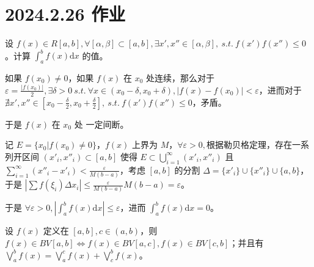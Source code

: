 \ifx\allfiles\undefined

\date{}
\author{尹锦润}

\maketitle
\fi

\section{2024.2.26 作业}

\begin{ques}
	设 $\displaystyle f( x) \in R[ a,b] ,\forall [ \alpha ,\beta ] \subset [ a,b] ,\exists x',x''\in [ \alpha ,\beta ] ,\ s.t.\ f( x') f( x'') \leqslant 0$。计算 $\displaystyle \int _{a}^{b} f( x)\mathrm{d} x$ 的值。
\end{ques}



如果 $\displaystyle f( x_{0}) \neq 0$，如果 $\displaystyle f( x)$ 在 $\displaystyle x_{0}$ 处连续，那么对于 $\displaystyle \varepsilon =\frac{|f( x_{0}) |}{2} ,\exists \delta  >0\ s.t.\ \forall x\in ( x_{0} -\delta ,x_{0} +\delta ) ,|f( x) -f( x_{0}) |< \varepsilon $，进而对于 $\displaystyle \nexists x',x''\in \left[ x_{0} -\frac{\delta }{2} ,x_{0} +\frac{\delta }{2}\right] ,\ s.t.\ f( x') f( x'') \leqslant 0$，矛盾。

于是 $\displaystyle f( x)$ 在 $\displaystyle x_{0}$ 处 一定间断。

记 $\displaystyle E=\{x_{0} | f( x_{0}) \neq 0\}$，$\displaystyle f( x)$ 上界为 $\displaystyle M$，$\displaystyle \forall \varepsilon  >0,$根据勒贝格定理，存在一系列开区间 $\displaystyle ( x'_{i} ,x''_{i}) \subset [ a,b]$ 使得 $\displaystyle E\subset \bigcup _{i=1}^{\infty }( x '_{i} ,x''_{i})$ 且 $\displaystyle \sum _{i=1}^{\infty }( x''_{i} -x'_{i}) < \frac{\varepsilon }{M( b-a)}$，考虑 $\displaystyle [ a,b]$ 的分割 $\displaystyle \Delta =\{x'_{i}\} \cup \{x''_{i}\} \cup \{a,b\}$，于是 $\displaystyle \left| \sum f( \xi _{i}) \Delta x_{i}\right| \leqslant \frac{\varepsilon }{M( b-a)} M( b-a) =\varepsilon $。

于是 $\displaystyle \forall \varepsilon  >0,\left| \int _{a}^{b} f( x)\mathrm{d} x\right| \leqslant \varepsilon $，进而 $\displaystyle \int _{a}^{b} f( x)\mathrm{d} x=0$。





\begin{ques}
	设 $\displaystyle f( x)$ 定义在 $\displaystyle [ a,b] ,c\in ( a,b)$，则 $\displaystyle f( x) \in BV[ a,b] \Leftrightarrow f( x) \in BV[ a,c] ,f( x) \in BV[ c,b]$；并且有 $\displaystyle \bigvee _{a}^{b} f( x) =\bigvee _{a}^{c} f( x) +\bigvee _{c}^{b} f( x)$。

\end{ques}


